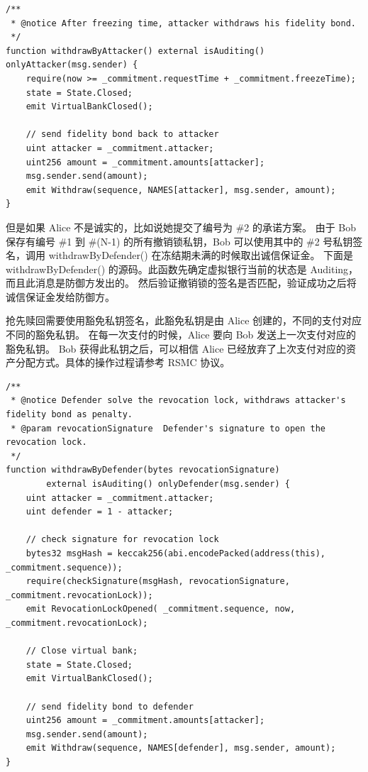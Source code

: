\begin{appendices}
\begin{lstlisting}[caption={锁定时间过后，进攻方取回诚信保证金}, label={lst:withdrawByAttacker}]
/**
 * @notice After freezing time, attacker withdraws his fidelity bond.
 */
function withdrawByAttacker() external isAuditing() onlyAttacker(msg.sender) {
    require(now >= _commitment.requestTime + _commitment.freezeTime);
    state = State.Closed;
    emit VirtualBankClosed();

    // send fidelity bond back to attacker
    uint attacker = _commitment.attacker;
    uint256 amount = _commitment.amounts[attacker];
    msg.sender.send(amount);
    emit Withdraw(sequence, NAMES[attacker], msg.sender, amount);
}
\end{lstlisting}

但是如果 Alice 不是诚实的，比如说她提交了编号为 \#2 的承诺方案。
由于 Bob 保存有编号 \#1 到 \#(N-1) 的所有撤销锁私钥，Bob 可以使用其中的 \#2 号私钥签名，调用 withdrawByDefender() 在冻结期未满的时候取出诚信保证金。
下面是 withdrawByDefender() 的源码。此函数先确定虚拟银行当前的状态是 Auditing，而且此消息是防御方发出的。
然后验证撤销锁的签名是否匹配，验证成功之后将诚信保证金发给防御方。

抢先赎回需要使用豁免私钥签名，此豁免私钥是由 Alice 创建的，不同的支付对应不同的豁免私钥。
在每一次支付的时候，Alice 要向 Bob 发送上一次支付对应的豁免私钥。
Bob 获得此私钥之后，可以相信 Alice 已经放弃了上次支付对应的资产分配方式。具体的操作过程请参考 RSMC 协议。

\begin{lstlisting}[caption={锁定时间内，防御方取出诚信保证金}, label={lst:withdrawByDefender}]
/**
 * @notice Defender solve the revocation lock, withdraws attacker's fidelity bond as penalty.
 * @param revocationSignature  Defender's signature to open the revocation lock.
 */
function withdrawByDefender(bytes revocationSignature) 
        external isAuditing() onlyDefender(msg.sender) {
    uint attacker = _commitment.attacker;
    uint defender = 1 - attacker;
    
    // check signature for revocation lock
    bytes32 msgHash = keccak256(abi.encodePacked(address(this), _commitment.sequence));
    require(checkSignature(msgHash, revocationSignature, _commitment.revocationLock));
    emit RevocationLockOpened( _commitment.sequence, now, _commitment.revocationLock);
    
    // Close virtual bank;
    state = State.Closed;
    emit VirtualBankClosed();
    
    // send fidelity bond to defender
    uint256 amount = _commitment.amounts[attacker];
    msg.sender.send(amount);
    emit Withdraw(sequence, NAMES[defender], msg.sender, amount);
}
\end{lstlisting}


\end{appendices}
